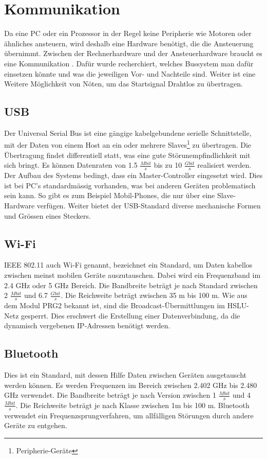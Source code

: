 \section{Kommunikation}
Da eine PC oder ein Prozessor in der Regel keine Peripherie wie Motoren oder ähnliches ansteuern, wird deshalb eine Hardware benötigt, die die Ansteuerung übernimmt. Zwischen der Rechnerhardware und der Ansteuerhardware braucht es eine Kommunikation . Dafür wurde recherchiert, welches Bussystem man dafür einsetzen könnte und was die jeweiligen Vor- und Nachteile sind. Weiter ist eine Weitere Möglichkeit von Nöten, um das Startsignal Drahtlos zu übertragen. 

\subsection{USB}
Der Universal Serial Bus ist eine gängige kabelgebundene serielle Schnittstelle, mit der Daten von einem Host an ein oder mehrere Slaves\footnote{Peripherie-Geräte} zu übertragen. Die Übertragung findet differentiell statt, was eine gute Störunempfindlichkeit mit sich bringt. Es können Datenraten von 1.5 $\frac{Mbit}{s}$ bis zu 10 $\frac{Gbit}{s}$ realisiert werden. Der Aufbau des Systems bedingt, dass ein Master-Controller eingesetzt wird. Dies ist bei PC's standardmässig vorhanden, was bei anderen Geräten problematisch sein kann. So gibt es zum Beispiel Mobil-Phones, die nur über eine Slave-Hardware verfügen. Weiter bietet der USB-Standard diverse mechanische Formen und Grössen eines Steckers.

\subsection{Wi-Fi}
IEEE 802.11 auch Wi-Fi genannt, bezeichnet ein Standard, um Daten kabellos zwischen meinst mobilen Geräte auszutauschen. Dabei wird ein Frequenzband im 2.4 GHz oder 5 GHz Bereich. Die Bandbreite beträgt je nach Standard zwischen 2 $\frac{Mbit}{s}$ und 6.7 $\frac{Gbit}{s}$. Die Reichweite beträgt zwischen 35 m bis 100 m. Wie aus dem Modul PRG2 bekannt ist, sind die Broadcast-Übermittlungen im HSLU-Netz gesperrt. Dies erschwert die Erstellung einer Datenverbindung, da die dynamisch vergebenen IP-Adressen benötigt werden.

\subsection{Bluetooth}
Dies ist ein Standard, mit dessen Hilfe Daten zwischen Geräten ausgetauscht werden können. Es werden Frequenzen im Bereich zwischen 2.402 GHz bis 2.480 GHz verwendet. Die Bandbreite beträgt je nach Version zwischen 1 $\frac{Mbit}{s}$ und 4 $\frac{Mbit}{s}$. Die Reichweite beträgt je nach Klasse zwischen 1m bis 100 m. Bluetooth verwendet ein Frequenzsprungverfahren, um allfälligen Störungen durch andere Geräte zu entgehen.